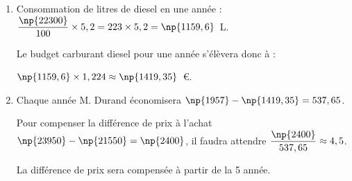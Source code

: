 \begin{enumerate}
\item %
Consommation de litres de diesel en une année : $\dfrac{\np{22300}}{100} \times 5,2 = 223 \times 5,2 = \np{1159,6}$~L.

Le budget carburant diesel pour une année s'élèvera donc à :

$\np{1159,6} \times 1,224 \approx \np{1419,35}$~\euro.
\item %

Chaque année M. Durand économisera $\np{1957} - \np{1419,35} = 537,65$.

Pour compenser la différence de prix à l'achat $\np{23950} - \np{21550} = \np{2400}$, il faudra attendre $\dfrac{\np{2400}}{537,65} \approx 4,5$.

La différence de prix sera compensée à partir de la 5 année.
\end{enumerate}

\bigskip


